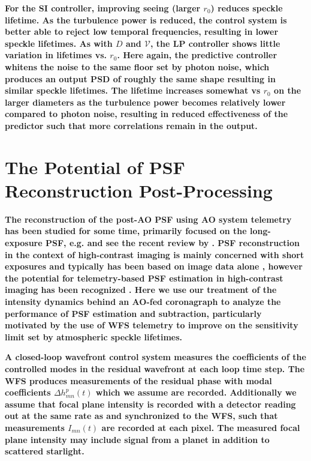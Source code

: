 \documentclass[10pt,preprint]{aastex631}
\begin{document}
\textbf{For the SI controller, improving seeing (larger $r_0$) reduces speckle lifetime.  As the turbulence power is reduced, the control system is better able to reject low temporal frequencies, resulting in lower speckle lifetimes.  As with $D$ and $\mathcal{V}$, the LP controller shows little variation in lifetimes vs. $r_0$.  Here again, the predictive controller whitens the noise to the same floor set by photon noise, which produces an output PSD of roughly the same shape resulting in similar speckle lifetimes.  The lifetime increases somewhat vs $r_0$ on the larger diameters as the turbulence power becomes relatively lower compared to photon noise, resulting in reduced effectiveness of the predictor such that more correlations remain in the output. }


\section{The Potential of \textbf{PSF} Reconstruction Post-Processing}
\label{sec:reconstruction}
\textbf{The reconstruction of the post-AO PSF using AO system telemetry has been studied for some time, primarily focused on the long-exposure PSF, e.g. \citet{1997JOSAA..14.3057V} and see the recent review by \citep{2020SPIE11448E..0AB}.  PSF reconstruction in the context of high-contrast imaging is mainly concerned with short exposures and typically has been based on image data alone \citep{2006ApJ...641..556M,2007ApJ...660..770L,2012ApJ...755L..28S}, however the potential for telemetry-based PSF estimation in high-contrast imaging has been recognized \citep{2013ApJ...767...21F,2013ApJ...767..100C}. Here we use our treatment of the intensity dynamics behind an AO-fed coronagraph to analyze the performance of PSF estimation and subtraction, particularly motivated by the use of WFS telemetry to improve on the sensitivity limit set by atmospheric speckle lifetimes.}

\textbf{A closed-loop wavefront control system measures the coefficients of the controlled modes in the residual wavefront at each loop time step.  The WFS produces measurements of the residual phase with modal coefficients $\Delta h_{mn}^{p}(t)$ which we assume are recorded. Additionally we assume that focal plane intensity is recorded with a detector reading out at the same rate as and synchronized to the WFS, such that measurements $I_{mn}(t)$ are recorded at each pixel. The measured focal plane intensity may include signal from a planet in addition to scattered starlight.}
\end{document}
